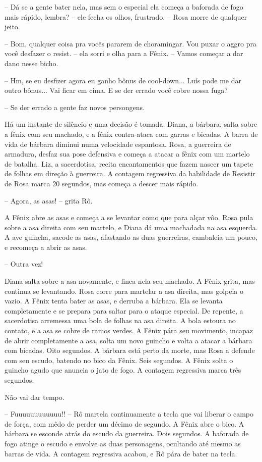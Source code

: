 -- Dá se a gente bater nela, mas sem o especial ela começa a baforada de fogo mais rápido, lembra? -- ele fecha os olhos, frustrado. -- Rosa morre de qualquer jeito.

-- Bom, qualquer coisa pra vocês pararem de choramingar. Vou puxar o aggro pra você desfazer o resist. -- ela sorri e olha para a Fênix. 
-- Vamos começar a dar dano nesse bicho.

-- Hm, se eu desfizer agora eu ganho bônus de cool-down... Luís pode me dar outro bônus... Vai ficar em cima. E se der errado você cobre nossa fuga?

-- Se der errado a gente faz novos persongens.

Há um instante de silêncio e uma decisão é tomada. Diana, a bárbara, salta sobre a fênix com seu machado, e a fênix contra-ataca com garras e bicadas. A barra de vida de bárbara diminui numa velocidade espantosa. Rosa, a guerreira de armadura, desfaz sua pose defensiva e começa a atacar a fênix com um martelo de batalha. Liz, a sacerdotisa, recita encantamentos que fazem nascer um tapete de folhas em direção à guerreira. A contagem regressiva da habilidade de Resistir de Rosa marca 20 segundos, mas começa a descer mais rápido.

-- Agora, as asas! -- grita Rô.

A Fênix abre as asas e começa a se levantar como que para alçar vôo. 
Rosa pula sobre a asa direita com seu martelo, e Diana dá uma machadada na asa esquerda.
A ave guincha, sacode as asas, afastando as duas guerreiras, cambaleia um pouco, e recomeça a abrir as asas.

-- Outra vez!

Diana salta sobre a asa novamente, e finca nela seu machado. A Fênix grita, mas continua se levantando.
Rosa corre para martelar a asa direita, mas golpeia o vazio.
A Fênix tenta bater as asas, e derruba a bárbara. Ela se levanta completamente e se prepara para saltar para o ataque especial.
De repente, a sacerdotisa arremessa uma bola de folhas na asa direita. A bola estoura no contato,
e a asa se cobre de ramos verdes. A Fênix pára seu movimento, incapaz de abrir completamente a asa, 
solta um novo guincho e volta a atacar a bárbara com bicadas. Oito segundos.
A bárbara está perto da morte, mas Rosa a defende com seu escudo, batendo no bico da Fênix. Seis segundos.
A Fênix solta o guincho agudo que anuncia o jato de fogo. A contagem regressiva marca três segundos.

Não vai dar tempo.

-- Fuuuuuuuuuuuu!! -- Rô martela continuamente a tecla que vai liberar o campo de força, com mêdo de perder um décimo de segundo.
A Fênix abre o bico. A bárbara se esconde atrás do escudo da guerreira. Dois segundos. 
A baforada de fogo atinge o escudo e envolve as duas personagens, ocultando até mesmo as barras de vida.
A contagem regressiva acabou, e Rô pára de bater na tecla.

